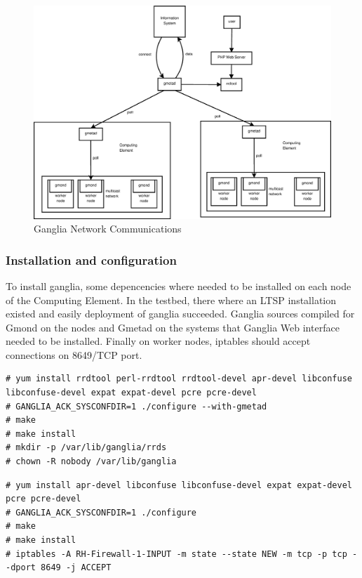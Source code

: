 \begin{figure}[htb]
\centering
 \includegraphics[width=130mm]{images/ganglia_data_flow.eps}
\caption{Ganglia Network Communications}
\label{figure:ganglia_network}
\end{figure}

\subsubsection{Installation and configuration}

To install ganglia, some depencencies where needed to be installed on each node of the Computing Element. In the testbed, there where an LTSP installation existed \cite{ltsp} and easily deployment of ganglia succeeded. Ganglia sources compiled for Gmond on the nodes and Gmetad on the systems that Ganglia Web interface needed to be installed. Finally on worker nodes, iptables should accept connections on 8649/TCP port.

\begin{lstlisting}
# yum install rrdtool perl-rrdtool rrdtool-devel apr-devel libconfuse libconfuse-devel expat expat-devel pcre pcre-devel
# GANGLIA_ACK_SYSCONFDIR=1 ./configure --with-gmetad
# make
# make install
# mkdir -p /var/lib/ganglia/rrds
# chown -R nobody /var/lib/ganglia
\end{lstlisting}

\begin{lstlisting}
# yum install apr-devel libconfuse libconfuse-devel expat expat-devel pcre pcre-devel
# GANGLIA_ACK_SYSCONFDIR=1 ./configure
# make
# make install
# iptables -A RH-Firewall-1-INPUT -m state --state NEW -m tcp -p tcp --dport 8649 -j ACCEPT
\end{lstlisting}

